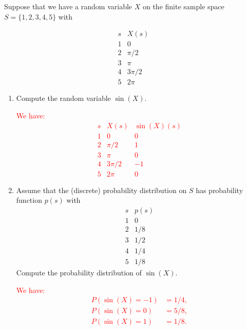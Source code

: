 \documentclass[12pt,reqno]{amsart}
\begin{document}
\bigskip
\prob Suppose that we have a random variable $X$ on the finite sample space $S = \{1,2,3,4,5\}$ with

	\[
	\begin{array}{c|c}
	s & X(s)  \\ \hline
	1 & 0  \\
	2 & \pi/2  \\
	3 & \pi \\
	4 & 3\pi/2 \\
	5 & 2\pi
	\end{array}
	\]

\medskip
\begin{enumerate}
\item Compute the random variable $\sin{(X)}$.
    
\bigskip
\textcolor{red}{We have:
    	\[
	\begin{array}{c|cc}
	s & X(s) & \sin(X)(s)  \\ \hline
	1 & 0 & 0  \\
	2 & \pi/2 & 1  \\
	3 & \pi & 0 \\
	4 & 3\pi/2 & -1 \\
	5 & 2\pi & 0
	\end{array}
	\]}
\bigskip

\item Assume that the (discrete) probability distribution on $S$ has probability function $p(s)$ with
    	\[
	\begin{array}{c|c}
	s & p(s)  \\ \hline
	1 & 0  \\
	2 & 1/8  \\
	3 & 1/2 \\
	4 & 1/4 \\
	5 & 1/8
	\end{array}
	\]
Compute the probability distribution of $\sin(X)$.

\bigskip
\textcolor{red}{We have:
	\begin{align*}
	P(\sin(X) = -1) &= 1/4, \\
	P(\sin(X) = 0) &= 5/8, \\
	P(\sin(X) = 1) &= 1/8. \\
	\end{align*}}
\end{enumerate}
\end{document}
